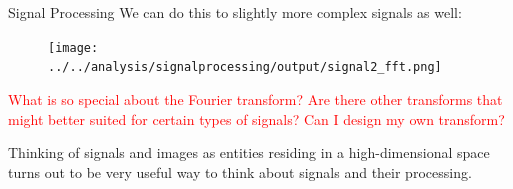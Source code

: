 \documentclass[aspectratio=169]{beamer}
\begin{document}
\begin{frame}{Signal Processing}
  We can do this to slightly more complex signals as well:
  \vspace{0.2cm}

  \begin{figure}
    \centering
    \texttt{[image: ../../analysis/signalprocessing/output/signal2\_fft.png]}
  \end{figure}

  \textcolor{red}{What is so special about the Fourier transform? Are there other transforms that might better suited for certain types of signals? Can I design my own transform?}
  \vspace{0.2cm}

  Thinking of signals and images as entities residing in a high-dimensional space turns out to be very useful way to think about signals and their processing.
\end{frame}
\end{document}
